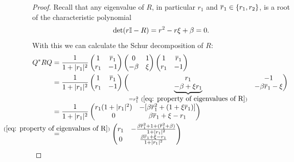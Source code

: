 \begin{proof}
	Recall that any eigenvalue of \(R\), in particular \(r_1\) and
	\(\overline{r}_1\in\{r_1, r_2\}\), is a root of the characteristic polynomial
	\begin{align}\label{eq: property of eigenvalues of R}
		\det (r\mathbb{I} - R) = r^2 - r\xi + \beta = 0.
	\end{align}
	With this we can calculate the Schur decomposition of \(R\):
	\begin{align*}
		Q^* R Q
		&= \frac{1}{1+|r_1|^2} \begin{pmatrix}
			1 & \conjugate{r}_1 \\
			r_{1} & -1
		\end{pmatrix}
		\begin{pmatrix}
			0 & 1 \\
			-\momCoeff & \xi
		\end{pmatrix}
		\begin{pmatrix}
			1 & \conjugate{r}_1 \\
			r_1 & -1
		\end{pmatrix}\\
		&= \frac{1}{1+|r_{1}|^2} \begin{pmatrix}
			1 & \conjugate{r}_1 \\
			r_1 & -1
		\end{pmatrix}
		\begin{pmatrix}
			r_1 & -1 \\
			\smash{\underbrace{-\momCoeff + \xi r_1}_{
				=r_1^2 \ (\ref{eq: property of eigenvalues of R})
			}}
			& -\momCoeff \conjugate{r}_1 - \xi
		\end{pmatrix}
		\vphantom{\underbrace{\begin{pmatrix}1\\1\end{pmatrix}}_{=2}}
		\\
		&=\frac{1}{1+|r_{1}|^2}\begin{pmatrix}
			r_1(1+|r_1|^2)
			& -[\momCoeff \conjugate{r}_1^2  + (1+\xi \conjugate{r}_1)] \\
			0 &  \momCoeff\conjugate{r}_1 + \xi - r_1
		\end{pmatrix}\\
		&\lxeq{(\ref{eq: property of eigenvalues of R})}\begin{pmatrix}
			r_1
			& -\frac{\momCoeff \conjugate{r}_1^2 + 1+ (\conjugate{r}_1^2 + \momCoeff)}{1+|r_1|^2} \\
			0 &  \frac{\momCoeff\conjugate{r}_1 + \xi - r_1}{1+|r_1|^2}
		\end{pmatrix}\\

\end{align*}
\end{proof}

